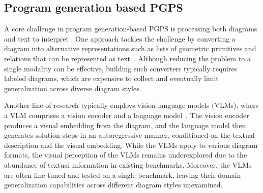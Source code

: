 
\subsection{Program generation based PGPS}

A core challenge in program generation-based PGPS is processing both diagrams and text to interpret \geofeat{}. One approach tackles the challenge by converting a diagram into alternative representations such as lists of geometric primitives and relations that can be represented as text~\citep{geos,geos-plus,intergps, GOLD, pgdp, geodrl}. Although reducing the problem to a single modality can be effective, building such converters typically requires labeled diagrams, which are expensive to collect and eventually limit generalization across diverse diagram styles.

Another line of research typically employs vision-language models (VLMs), where a VLM comprises a vision encoder and a language model~\citep{pgps,geoqa,geoqa-plus,scagps,unigeo,unimath,geox,LANS}. 
The vision encoder produces a visual embedding from the diagram, and the language model then generates solution steps in an autoregressive manner, conditioned on the textual description and the visual embedding.
While the VLMs apply to various diagram formats, the visual \geofeat{} perception of the VLMs remains underexplored due to the abundance of textual information in existing benchmarks. 
Moreover, the VLMs are often fine-tuned and tested on a single benchmark, leaving their domain generalization capabilities across different diagram styles unexamined. 

